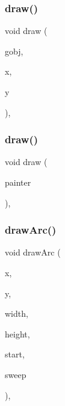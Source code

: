 \mbox{\label{classGForwardDrawingSurface_a5e76aee0d6572049baceef716b14b36c}} 
\subsubsection{\texorpdfstring{draw()}{draw()}\hspace{0.1cm}{\footnotesize\ttfamily [4/5]}}
{\footnotesize\ttfamily void draw (\begin{DoxyParamCaption}\item[{\mbox{\hyperlink{classGObject}{G\+Object}} \&}]{gobj,  }\item[{double}]{x,  }\item[{double}]{y }\end{DoxyParamCaption})\hspace{0.3cm}{\ttfamily [virtual]}, {\ttfamily [inherited]}}

\mbox{\label{classGForwardDrawingSurface_ae0e86a4511cc3643db793e5212b44b4c}} 
\subsubsection{\texorpdfstring{draw()}{draw()}\hspace{0.1cm}{\footnotesize\ttfamily [5/5]}}
{\footnotesize\ttfamily void draw (\begin{DoxyParamCaption}\item[{Q\+Painter $\ast$}]{painter }\end{DoxyParamCaption})\hspace{0.3cm}{\ttfamily [virtual]}, {\ttfamily [inherited]}}

\mbox{\label{classGDrawingSurface_a38b6fae1045191c57092b49905068144}} 
\subsubsection{\texorpdfstring{draw\+Arc()}{drawArc()}}
{\footnotesize\ttfamily void draw\+Arc (\begin{DoxyParamCaption}\item[{double}]{x,  }\item[{double}]{y,  }\item[{double}]{width,  }\item[{double}]{height,  }\item[{double}]{start,  }\item[{double}]{sweep }\end{DoxyParamCaption})\hspace{0.3cm}{\ttfamily [virtual]}, {\ttfamily [inherited]}}



